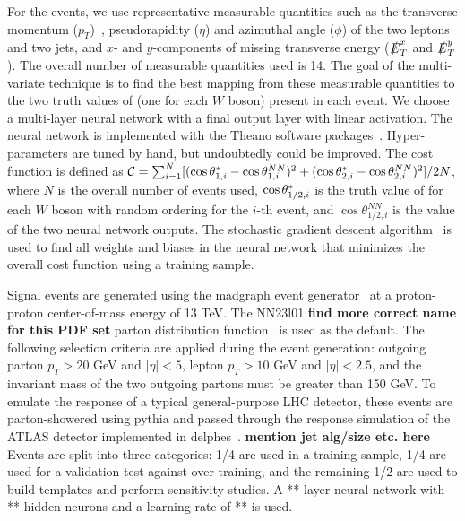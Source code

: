 For the \ssWW events, we use representative measurable quantities such
as the transverse momentum ($p_T$)~\cite{coordinate}, pseudorapidity ($\eta$) and
azimuthal angle ($\phi$) of the two leptons and two jets, and $x$- and $y$-components 
of missing transverse energy ($\slashed{E}_T^x$ and
$\slashed{E}_T^y$).  The overall number of measurable quantities used is 14. 
The goal of the multi-variate technique is to find
the best mapping from these measurable quantities to the two truth
values of \cts (one for each $W$ boson) present in each event.  We
choose a multi-layer neural network with a final output layer with
linear activation. The neural network is implemented with the Theano
software packages~\cite{theano}. Hyper-parameters are tuned by hand,
but undoubtedly could be improved.  The cost function is defined as 
${\cal{C}}= \sum_{i=1}^{N} [(\ctsnb_{1,i} -\cos \theta^{NN}_{1,i})^2+(\ctsnb_{2,i}-\cos \theta^{NN}_{2,i})^2]/2N$, 
where $N$ is the overall number of events used,
$ \cos  \theta^{*}  _{1/2,i}$ is the truth value of \cts for each $W$ boson with
random ordering for the $i$-th event, and $\cos \theta^{NN}_{1/2, i}$ is the value of
the two neural network outputs.  The stochastic gradient descent
algorithm~\cite{sgd} is used to find all weights and biases in the
neural network that minimizes the overall cost function using a
training sample.

Signal \ssWW events are generated using the {\sc madgraph} event generator~\cite{madgraph} at a proton-proton center-of-mass energy of 13 TeV.  
The NN23l01 {\bf find more correct name for this PDF set} parton distribution function~\cite{pdf} is used as the default. 
The following selection criteria are applied during the event generation: outgoing parton $p_T > 20$ GeV and $|\eta| < 5$, 
lepton $p_T > 10$ GeV and $|\eta| < 2.5$, and the invariant mass of the two outgoing partons must be greater than 150 GeV.
To emulate the response of a typical general-purpose LHC detector, these events are parton-showered using {\sc pythia}\cite{pythia} and passed through the 
response simulation of the ATLAS detector implemented in {\sc delphes}~\cite{delphes}. {\bf mention jet alg/size etc. here} Events
are split into three categories: 1/4 are used in a training sample,
1/4 are used for a validation test against over-training, and the
remaining 1/2 are used to build templates and perform sensitivity
studies. A ** layer neural network with ** hidden neurons and a
learning rate of ** is used.

